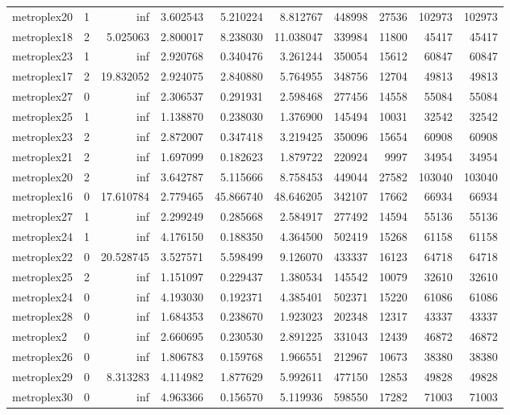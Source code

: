 \documentclass[../../../thesis.tex]{subfiles}
\begin{document}
\begin{longtable}{|l|r|r|r|r|r|r|r|r|r|}
metroplex20 & 1 & inf & 3.602543 & 5.210224 & 8.812767 & 448998 & 27536 & 102973 & 102973 \\
metroplex18 & 2 & 5.025063 & 2.800017 & 8.238030 & 11.038047 & 339984 & 11800 & 45417 & 45417 \\
metroplex23 & 1 & inf & 2.920768 & 0.340476 & 3.261244 & 350054 & 15612 & 60847 & 60847 \\
metroplex17 & 2 & 19.832052 & 2.924075 & 2.840880 & 5.764955 & 348756 & 12704 & 49813 & 49813 \\
metroplex27 & 0 & inf & 2.306537 & 0.291931 & 2.598468 & 277456 & 14558 & 55084 & 55084 \\
metroplex25 & 1 & inf & 1.138870 & 0.238030 & 1.376900 & 145494 & 10031 & 32542 & 32542 \\
metroplex23 & 2 & inf & 2.872007 & 0.347418 & 3.219425 & 350096 & 15654 & 60908 & 60908 \\
metroplex21 & 2 & inf & 1.697099 & 0.182623 & 1.879722 & 220924 & 9997 & 34954 & 34954 \\
metroplex20 & 2 & inf & 3.642787 & 5.115666 & 8.758453 & 449044 & 27582 & 103040 & 103040 \\
metroplex16 & 0 & 17.610784 & 2.779465 & 45.866740 & 48.646205 & 342107 & 17662 & 66934 & 66934 \\
metroplex27 & 1 & inf & 2.299249 & 0.285668 & 2.584917 & 277492 & 14594 & 55136 & 55136 \\
metroplex24 & 1 & inf & 4.176150 & 0.188350 & 4.364500 & 502419 & 15268 & 61158 & 61158 \\
metroplex22 & 0 & 20.528745 & 3.527571 & 5.598499 & 9.126070 & 433337 & 16123 & 64718 & 64718 \\
metroplex25 & 2 & inf & 1.151097 & 0.229437 & 1.380534 & 145542 & 10079 & 32610 & 32610 \\
metroplex24 & 0 & inf & 4.193030 & 0.192371 & 4.385401 & 502371 & 15220 & 61086 & 61086 \\
metroplex28 & 0 & inf & 1.684353 & 0.238670 & 1.923023 & 202348 & 12317 & 43337 & 43337 \\
metroplex2 & 0 & inf & 2.660695 & 0.230530 & 2.891225 & 331043 & 12439 & 46872 & 46872 \\
metroplex26 & 0 & inf & 1.806783 & 0.159768 & 1.966551 & 212967 & 10673 & 38380 & 38380 \\
metroplex29 & 0 & 8.313283 & 4.114982 & 1.877629 & 5.992611 & 477150 & 12853 & 49828 & 49828 \\
metroplex30 & 0 & inf & 4.963366 & 0.156570 & 5.119936 & 598550 & 17282 & 71003 & 71003 \\

\end{longtable}
\end{document}
